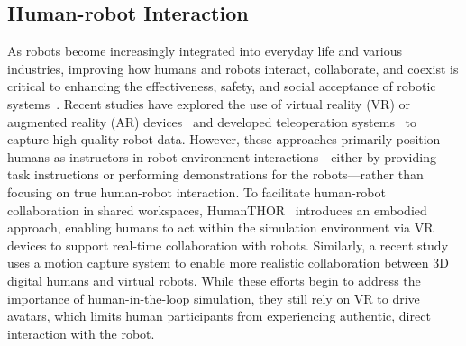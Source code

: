 
\subsection{Human-robot Interaction}
As robots become increasingly integrated into everyday life and various industries, improving how humans and robots interact, collaborate, and coexist is critical to enhancing the effectiveness, safety, and social acceptance of robotic systems~\cite{cakmak2011human}. Recent studies have explored the use of virtual reality (VR) or augmented reality (AR) devices~\cite{chen2024arcap, yang2024arcade, park2024dexhub, nechyporenko2024armada} and developed teleoperation systems~\cite{wonsick2021human,mosbach2022accelerating, iyer2024open, cheng2024open} to capture high-quality robot data. However, these approaches primarily position humans as instructors in robot-environment interactions—either by providing task instructions or performing demonstrations for the robots—rather than focusing on true human-robot interaction. To facilitate human-robot collaboration in shared workspaces, HumanTHOR~\cite{HumanTHOR} introduces an embodied approach, enabling humans to act within the simulation environment via VR devices to support real-time collaboration with robots. Similarly, a recent study~\cite{liu2024collabsphere} uses a motion capture system to enable more realistic collaboration between 3D digital humans and virtual robots. While these efforts begin to address the importance of human-in-the-loop simulation, they still rely on VR to drive avatars, which limits human participants from experiencing authentic, direct interaction with the robot.

